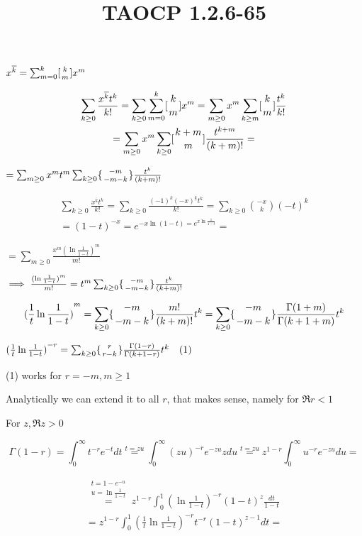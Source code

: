 \documentclass{article}
\title{TAOCP 1.2.6\mbox{-}65}
\begin{document}
\maketitle

\( x^{\overline{k}} = \sum_{m=0}^{k} [{k \atop m}]x^{m} \)

\begin{multline*}
\sum_{k \geq 0} \frac{x^{\overline{k}}t^{k}}{k!} = \sum_{k \geq 0} \sum_{m=0}^{k} [{k \atop m}]x^{m} = \sum_{m\geq 0}x^{m} \sum_{k \geq m} [{k \atop m}] \frac{t^{k}}{k!} \\
= \sum_{m\geq 0}x^{m} \sum_{k \geq 0} [{{k + m} \atop m}] \frac{t^{k+m}}{(k+m)!} =
\end{multline*}

\( = \sum_{m\geq 0}x^{m}t^{m} \sum_{k \geq 0} \{{{-m} \atop {-m-k}}\} \frac{t^{k}}{(k+m)!} \)

\begin{multline*}
\sum_{k \geq 0} \frac{x^{\overline{k}}t^{k}}{k!} = \sum_{k \geq 0} \frac{{(-1)}^{k}{(-x)}^{\underline{k}}t^{k}}{k!} = \sum_{k \geq 0} \binom{-x}{k}{(-t)}^{k} \\
= {(1-t)}^{-x} = e^{-x \ln(1-t) = e^{x\ln\frac{1}{1-t}}} =
\end{multline*}

\( = \sum_{m \geq 0}\frac{x^{m}{(\ln\frac{1}{1-t})}^{m}}{m!} \)

\( \implies \frac{{(\ln\frac{1}{1-t})}^{m}}{m!} = t^{m} \sum_{k \geq 0} \{{{-m} \atop {-m-k}}\} \frac{t^{k}}{(k+m)!} \)

\[ {(\frac{1}{t}\ln\frac{1}{1-t})}^{m} = \sum_{k \geq 0} \{{{-m} \atop {-m-k}}\} \frac{m!}{(k+m)!} t^{k} = \sum_{k \geq 0} \{{{-m} \atop {-m-k}}\} \frac{\Gamma(1+m)}{\Gamma(k+1+m)} t^{k} \]

\( {(\frac{1}{t}\ln\frac{1}{1-t})}^{-r} = \sum_{k \geq 0} \{{{r} \atop {r-k}}\} \frac{\Gamma(1-r)}{\Gamma(k+1-r)} t^{k}\quad (1) \)

(1) works for \( r = -m, m \geq 1 \)

Analytically we can extend it to all \( r \), that makes sense, namely for \( \Re{r} < 1 \)

For \( z, \Re z > 0 \)

\[ \Gamma(1-r) = \int_{0}^\infty t^{-r} e^{-t} dt \overset{t=zu}{=} \int_{0}^\infty {(zu)}^{-r} e^{-zu} z du \overset{t=zu}{=} z^{1-r} \int_{0}^\infty u^{-r}e^{-zu}du = \]

\begin{multline*}
\overset{\substack{t = 1 - e^{-u}\\u = \ln{\frac{1}{1-t}}}}{=} z^{1-r} \int_{0}^{1} {(\ln{\frac{1}{1-t}})}^{-r} {(1-t)}^{z} \frac{dt}{1-t} \\
= z^{1-r} \int_{0}^{1} {(\frac{1}{t}\ln{\frac{1}{1-t}})}^{-r} t^{-r}{(1-t)}^{z-1} dt =
\end{multline*}
\end{document}

